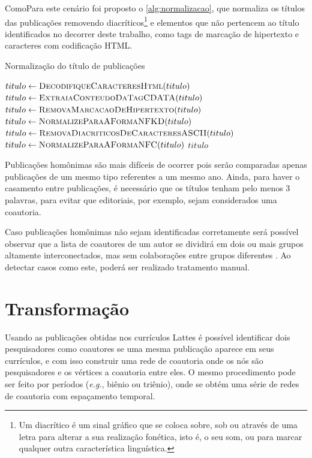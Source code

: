 ComoPara este cenário foi proposto o \autoref{alg:normalizacao}, que normaliza os títulos das publicações removendo diacríticos\footnote{Um diacrítico é um sinal gráfico que se coloca sobre, sob ou através de uma letra para alterar a sua realização fonética, isto é, o seu som, ou para marcar qualquer outra característica linguística.} e elementos que não pertencem ao título identificados no decorrer deste trabalho, como tags de marcação de hipertexto e caracteres com codificação HTML.

\begin{algorithm}
  \caption{Normalização do título de publicações}
  \label{alg:normalizacao}
  \begin{algorithmic}[1]
    \State $titulo\gets \Call{DecodifiqueCaracteresHtml}{titulo}$
    \State $titulo\gets \Call{ExtraiaConteudoDaTagCDATA}{titulo}$
    \State $titulo\gets \Call{RemovaMarcacaoDeHipertexto}{titulo}$
    \State $titulo\gets \Call{NormalizeParaAFormaNFKD}{titulo}$
    \State $titulo\gets \Call{RemovaDiacriticosDeCaracteresASCII}{titulo}$
    \State $titulo\gets \Call{NormalizeParaAFormaNFC}{titulo}$
    \State \Return $titulo$
  \EndProcedure
  \end{algorithmic}
\end{algorithm}

Publicações homônimas são mais difíceis de ocorrer pois serão comparadas apenas publicações de um mesmo tipo referentes a um mesmo ano. Ainda, para haver o casamento entre publicações, é necessário que os títulos tenham pelo menos 3 palavras, para evitar que editoriais, por exemplo, sejam considerados uma coautoria.

Caso publicações homônimas não sejam identificadas corretamente será possível observar que a lista de coautores de um autor se dividirá em dois ou mais grupos altamente interconectados, mas sem colaborações entre grupos diferentes \cite{franceschet2011collaboration}. Ao detectar casos como este, poderá ser realizado tratamento manual.

\section{Transformação}

Usando as publicações obtidas nos currículos Lattes é possível identificar dois pesquisadores como coautores se uma mesma publicação aparece em seus currículos, e com isso construir uma rede de coautoria onde os nós são pesquisadores e os vértices a coautoria entre eles. O mesmo procedimento pode ser feito por períodos (\textit{e.g.}, biênio ou triênio), onde se obtém uma série de redes de coautoria com espaçamento temporal.


